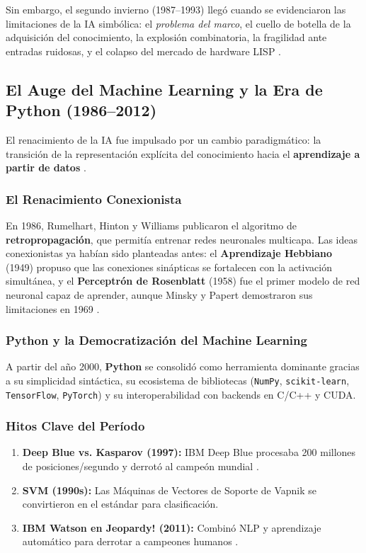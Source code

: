 \documentclass[12pt,a4paper]{article}
\begin{document}
Sin embargo, el segundo invierno (1987--1993) llegó cuando se evidenciaron las limitaciones de la IA simbólica: el \textit{problema del marco}, el cuello de botella de la adquisición del conocimiento, la explosión combinatoria, la fragilidad ante entradas ruidosas, y el colapso del mercado de hardware LISP \citep{haenlein2019}.

\subsection{El Auge del Machine Learning y la Era de Python (1986--2012)}

El renacimiento de la IA fue impulsado por un cambio paradigmático: la transición de la representación explícita del conocimiento hacia el \textbf{aprendizaje a partir de datos} \citep{lecun2015}.

\subsubsection{El Renacimiento Conexionista}

En 1986, Rumelhart, Hinton y Williams publicaron el algoritmo de \textbf{retropropagación}, que permitía entrenar redes neuronales multicapa. Las ideas conexionistas ya habían sido planteadas antes: el \textbf{Aprendizaje Hebbiano} (1949) propuso que las conexiones sinápticas se fortalecen con la activación simultánea, y el \textbf{Perceptrón de Rosenblatt} (1958) fue el primer modelo de red neuronal capaz de aprender, aunque Minsky y Papert demostraron sus limitaciones en 1969 \citep{haenlein2019}.

\subsubsection{Python y la Democratización del Machine Learning}

A partir del año 2000, \textbf{Python} se consolidó como herramienta dominante gracias a su simplicidad sintáctica, su ecosistema de bibliotecas (\texttt{NumPy}, \texttt{scikit-learn}, \texttt{TensorFlow}, \texttt{PyTorch}) y su interoperabilidad con backends en C/C++ y CUDA.

\subsubsection{Hitos Clave del Período}

\begin{enumerate}
    \item \textbf{Deep Blue vs. Kasparov (1997):} IBM Deep Blue procesaba 200 millones de posiciones/segundo y derrotó al campeón mundial \citep{haenlein2019}.
    \item \textbf{SVM (1990s):} Las Máquinas de Vectores de Soporte de Vapnik se convirtieron en el estándar para clasificación.
    \item \textbf{IBM Watson en Jeopardy! (2011):} Combinó NLP y aprendizaje automático para derrotar a campeones humanos \citep{buchanan2012}.
\end{enumerate}
\end{document}
